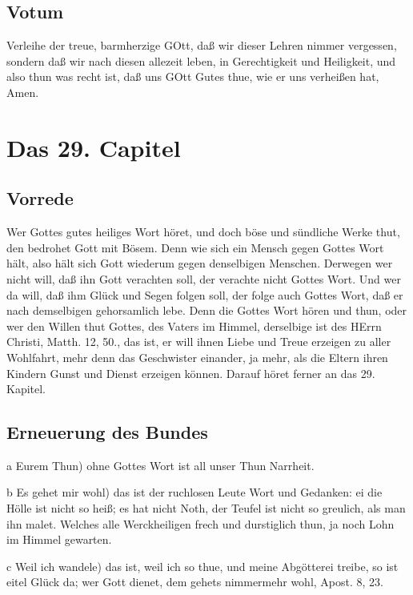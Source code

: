 \section{Votum}

Verleihe der treue, barmherzige GOtt, daß wir dieser Lehren nimmer vergessen, sondern daß wir nach diesen allezeit leben, in Gerechtigkeit und Heiligkeit, und also thun was recht ist, daß uns GOtt Gutes thue, wie er uns verheißen hat, Amen.

\chapter{Das 29. Capitel}

\section{Vorrede}

Wer Gottes gutes heiliges Wort höret, und doch böse und sündliche Werke thut, den bedrohet Gott mit Bösem. Denn wie sich ein Mensch gegen Gottes Wort hält, also hält sich Gott wiederum gegen denselbigen Menschen. Derwegen wer nicht will, daß ihn Gott verachten soll, der verachte nicht Gottes Wort. Und wer da will, daß ihm Glück und Segen folgen soll, der folge auch Gottes Wort, daß er nach demselbigen gehorsamlich lebe. Denn die Gottes Wort hören und thun, oder wer den Willen thut Gottes, des Vaters im Himmel, derselbige ist des HErrn Christi, Matth. 12, 50., das ist, er will ihnen Liebe und Treue erzeigen zu aller Wohlfahrt, mehr denn das Geschwister einander, ja mehr, als die Eltern ihren Kindern Gunst und Dienst erzeigen können. Darauf höret ferner an das 29. Kapitel.

\section{Erneuerung des Bundes}

a Eurem Thun) ohne Gottes Wort ist all unser Thun Narrheit.

b Es gehet mir wohl) das ist der ruchlosen Leute Wort und Gedanken: ei die Hölle ist nicht so heiß; es hat nicht Noth, der Teufel ist nicht so greulich, als man ihn malet. Welches alle Werckheiligen frech und durstiglich thun, ja noch Lohn im Himmel gewarten.

c Weil ich wandele) das ist, weil ich so thue, und meine Abgötterei treibe, so ist eitel Glück da; wer Gott dienet, dem gehets nimmermehr wohl, Apost. 8, 23.

